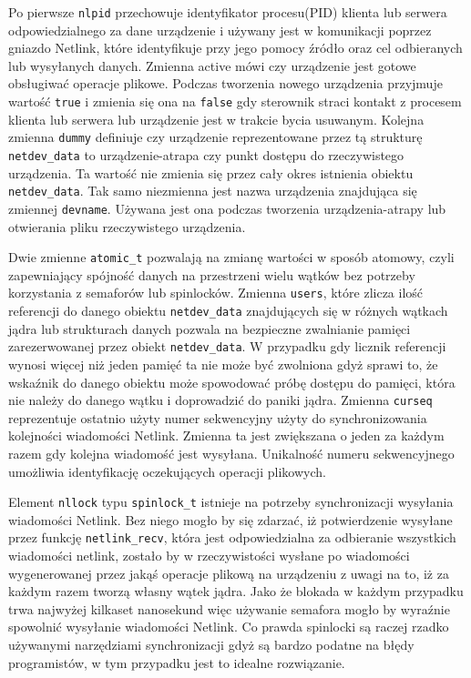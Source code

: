 \documentclass[10pt]{article}
\begin{document}
Po pierwsze \texttt{nlpid} przechowuje identyfikator procesu(PID) klienta lub serwera odpowiedzialnego za dane urządzenie i używany jest w komunikacji poprzez gniazdo Netlink, które identyfikuje przy jego pomocy źródło oraz cel odbieranych lub wysyłanych danych. Zmienna active mówi czy urządzenie jest gotowe obsługiwać operacje plikowe. Podczas tworzenia nowego urządzenia przyjmuje wartość \texttt{true} i zmienia się ona na \texttt{false} gdy sterownik straci kontakt z procesem klienta lub serwera lub urządzenie jest w trakcie bycia usuwanym.  Kolejna zmienna \texttt{dummy} definiuje czy urządzenie reprezentowane przez tą strukturę \texttt{netdev\_data} to urządzenie-atrapa czy punkt dostępu do rzeczywistego urządzenia. Ta wartość nie zmienia się przez cały okres istnienia obiektu \texttt{netdev\_data}. Tak samo niezmienna jest nazwa urządzenia znajdująca się zmiennej \texttt{devname}. Używana jest ona podczas tworzenia urządzenia-atrapy lub otwierania pliku rzeczywistego urządzenia.

Dwie zmienne \texttt{atomic\_t} pozwalają na zmianę wartości w sposób atomowy, czyli zapewniający spójność danych na przestrzeni wielu wątków bez potrzeby korzystania z semaforów lub spinlocków. Zmienna \texttt{users}, które zlicza ilość referencji do danego obiektu \texttt{netdev\_data} znajdujących się w różnych wątkach jądra lub strukturach danych pozwala na bezpieczne zwalnianie pamięci zarezerwowanej przez obiekt \texttt{netdev\_data}. W przypadku gdy licznik referencji wynosi więcej niż jeden pamięć ta nie może być zwolniona gdyż sprawi to, że wskaźnik do danego obiektu może spowodować próbę dostępu do pamięci, która nie należy do danego wątku i doprowadzić do paniki jądra. Zmienna \texttt{curseq} reprezentuje ostatnio użyty numer sekwencyjny użyty do synchronizowania kolejności wiadomości Netlink. Zmienna ta jest zwiększana o jeden za każdym razem gdy kolejna wiadomość jest wysyłana. Unikalność numeru sekwencyjnego umożliwia identyfikację oczekujących operacji plikowych.

Element \texttt{nllock} typu \texttt{spinlock\_t} istnieje na potrzeby synchronizacji wysyłania wiadomości Netlink. Bez niego mogło by się zdarzać, iż potwierdzenie wysyłane przez funkcję \texttt{netlink\_recv}, która jest odpowiedzialna za odbieranie wszystkich wiadomości netlink, zostało by w rzeczywistości wysłane po wiadomości wygenerowanej przez jakąś operacje plikową na urządzeniu z uwagi na to, iż za każdym razem tworzą własny wątek jądra. Jako że blokada w każdym przypadku trwa najwyżej kilkaset nanosekund więc używanie semafora mogło by wyraźnie spowolnić wysyłanie wiadomości Netlink. Co prawda spinlocki są raczej rzadko używanymi narzędziami synchronizacji gdyż są bardzo podatne na błędy programistów, w tym przypadku jest to idealne rozwiązanie.
\end{document}
